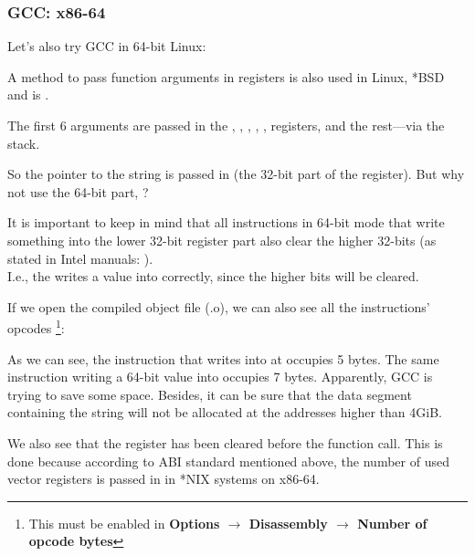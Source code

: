 \subsubsection{GCC: x86-64}

Let's also try GCC in 64-bit Linux:



A method to pass function arguments in registers is also used in Linux, *BSD and \MacOSX is \SysVABI.

The first 6 arguments are passed in the \RDI, \RSI, \RDX, \RCX, ,   registers, and the rest---via the stack.

So the pointer to the string is passed in \EDI (the 32-bit part of the register).
But why not use the 64-bit part, \RDI?

It is important to keep in mind that all \MOV instructions in 64-bit mode that write something into the lower 32-bit register part also clear the higher 32-bits (as stated in Intel manuals: ).\\
I.e., the  writes a value into \RAX correctly, since the higher bits will be cleared.

If we open the compiled object file (.o), we can also see all the instructions' opcodes
\footnote{This must be enabled in \textbf{Options $\rightarrow$ Disassembly $\rightarrow$ Number of opcode bytes}}:



\label{hw_EDI_instead_of_RDI}
As we can see, the instruction that writes into \EDI at  occupies 5 bytes.
The same instruction writing a 64-bit value into \RDI occupies 7 bytes.
Apparently, GCC is trying to save some space.
Besides, it can be sure that the data segment containing the string will not be allocated at the addresses higher than 4\gls{GiB}.

\label{SysVABI_input_EAX}
We also see that the \EAX register has been cleared before the \printf function call.
This is done because according to \ac{ABI} standard mentioned above,
the number of used vector registers is passed in \EAX in *NIX systems on x86-64.

